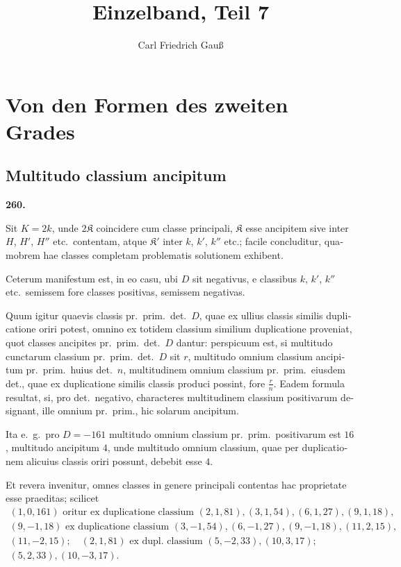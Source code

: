 \documentclass[12pt,a4paper]{article}
\title{Einzelband, Teil 7}
\author{Carl Friedrich Gau\ss}
\date{}
\theoremstyle{plain}
\theoremstyle{definition}
\theoremstyle{remark}
\begin{document}
\maketitle

\section*{Von den Formen des zweiten Grades}

\subsection*{Multitudo classium ancipitum}

\begin{otherlanguage}{latin}

\textbf{260.}

Sit $K = 2k$, unde $2\mathfrak{K}$ coincidere cum classe principali, $\mathfrak{K}$ esse ancipitem sive inter $H$, $H'$, $H''$ etc.\ contentam, atque $\mathfrak{K}'$ inter $k$, $k'$, $k''$ etc.; facile concluditur, quamobrem hae classes completam problematis solutionem exhibent.

Ceterum manifestum est, in eo casu, ubi $D$ sit negativus, e classibus $k$, $k'$, $k''$ etc.\ semissem fore classes positivas, semissem negativas.

Quum igitur quaevis classis pr.\ prim.\ det.\ $D$, quae ex ullius classis similis duplicatione oriri potest, omnino ex totidem classium similium duplicatione proveniat, quot classes ancipites pr.\ prim.\ det.\ $D$ dantur: perspicuum est, si multitudo cunctarum classium pr.\ prim.\ det.\ $D$ sit $r$, multitudo omnium classium ancipitum pr.\ prim.\ huius det.\ $n$, multitudinem omnium classium pr.\ prim.\ eiusdem det., quae ex duplicatione similis classis produci possint, fore $\frac{r}{n}$. Eadem formula resultat, si, pro det.\ negativo, characteres multitudinem classium positivarum designant, ille omnium pr.\ prim., hic solarum ancipitum.

Ita e.\ g.\ pro $D = -161$ multitudo omnium classium pr.\ prim.\ positivarum est $16$, multitudo ancipitum $4$, unde multitudo omnium classium, quae per duplicationem alicuius classis oriri possunt, debebit esse $4$.

Et revera invenitur, omnes classes in genere principali contentas hac proprietate esse praeditas; scilicet
\begin{gather*}
(1,0,161) \text{ oritur ex duplicatione classium } (2,1,81), (3,1,54), (6,1,27), (9,1,18),\\
(9,-1,18) \text{ ex duplicatione classium } (3,-1,54), (6,-1,27), (9,-1,18), (11,2,15),\\
(11,-2,15);\quad (2,1,81) \text{ ex dupl.\ classium } (5,-2,33), (10,3,17);\\
(5,2,33), (10,-3,17).
\end{gather*}


\end{otherlanguage}
\end{document}
